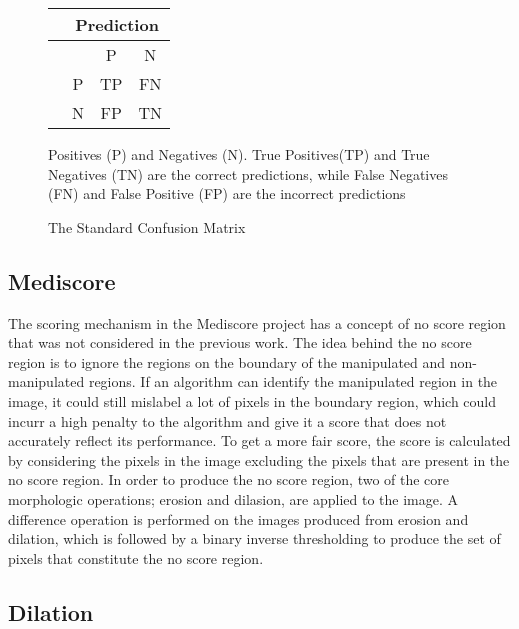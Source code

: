 \begin{figure}
    \centering
    \def\arraystretch{1.5}%
    \setlength{\tabcolsep}{1.5em} %
    \begin{tabular}{|c|c|c|c|}
        \hline
        & \multicolumn{3}{c|}{Prediction} \\
        \hline
        \parbox[t]{2mm}{} & &P &N \\
        &  P & TP& FN \\
        & N& FP& TN \\
        \hline
        \end{tabular}

    \caption{The Standard Confusion Matrix }
    \medskip
    \footnotesize  Positives (P) and Negatives (N). True Positives(TP) and True Negatives (TN) are the correct predictions, while False Negatives (FN) and False Positive (FP)
    are the incorrect predictions
    
    
    \label{fig:confusion_matrix}
\end{figure}

\subsection{Mediscore}

The scoring mechanism in the Mediscore project has a concept of no score region that was not considered in the previous work. The idea behind the no score region is to 
ignore the regions on the boundary of the manipulated and non-manipulated regions. If an algorithm can identify the manipulated region in the image, it could still 
mislabel a lot of pixels in the boundary region, which could incurr a high penalty to the algorithm and give it a score that does not accurately reflect its performance.
To get a more fair score, the score is calculated by considering the pixels in the image excluding the pixels that are present in the no score region. In order to produce
the no score region, two of the core morphologic operations; erosion and dilasion, are applied to the image. A difference operation is performed on the images produced 
from erosion and dilation, which is followed by a binary inverse thresholding to produce the set of pixels that constitute the no score region.

\subsection{Dilation}

